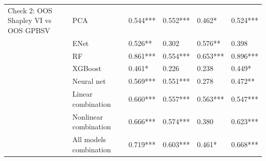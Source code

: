 \begin{tabular}{llllll}
Check 2: OOS Shapley VI vs OOS GPBSV & PCA &  0.544*** &  0.552*** &    0.462* &  0.524*** \\
                                     & ENet &   0.526** &     0.302 &   0.576** &     0.398 \\
                                     & RF &  0.861*** &  0.554*** &  0.653*** &  0.896*** \\
                                     & XGBoost &    0.461* &     0.226 &     0.238 &    0.449* \\
                                     & Neural net &  0.569*** &  0.551*** &     0.278 &   0.472** \\
                                     & Linear combination &  0.660*** &  0.557*** &  0.563*** &  0.547*** \\
                                     & Nonlinear combination &  0.666*** &  0.574*** &     0.380 &  0.623*** \\
                                     & All models combination &  0.719*** &  0.603*** &    0.461* &  0.668*** \\
\bottomrule
\end{tabular}

